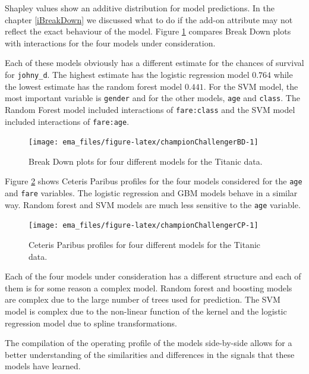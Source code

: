\documentclass[]{krantz}
\begin{document}
Shapley values show an additive distribution for model predictions. In the chapter \ref{iBreakDown} we discussed what to do if the add-on attribute may not reflect the exact behaviour of the model.
Figure \ref{fig:championChallengerBD} compares Break Down plots with interactions for the four models under consideration.

Each of these models obviously has a different estimate for the chances of survival for \texttt{johny\_d}. The highest estimate has the logistic regression model \(0.764\) while the lowest estimate has the random forest model \(0.441\). For the SVM model, the most important variable is \texttt{gender} and for the other models, \texttt{age} and \texttt{class}. The Random Forest model included interactions of \texttt{fare:class} and the SVM model included interactions of \texttt{fare:age}.

\begin{figure}

{\centering \texttt{[image: ema\_files/figure-latex/championChallengerBD-1]} 

}

\caption{Break Down plots for four different models for the Titanic data.}\label{fig:championChallengerBD}
\end{figure}

Figure \ref{fig:championChallengerCP} shows Ceteris Paribus profiles for the four models considered for the \texttt{age} and \texttt{fare} variables.
The logistic regression and GBM models behave in a similar way. Random forest and SVM models are much less sensitive to the \texttt{age} variable.

\begin{figure}

{\centering \texttt{[image: ema\_files/figure-latex/championChallengerCP-1]} 

}

\caption{Ceteris Paribus profiles for four different models for the Titanic data.}\label{fig:championChallengerCP}
\end{figure}

Each of the four models under consideration has a different structure and each of them is for some reason a complex model. Random forest and boosting models are complex due to the large number of trees used for prediction. The SVM model is complex due to the non-linear function of the kernel and the logistic regression model due to spline transformations.

The compilation of the operating profile of the models side-by-side allows for a better understanding of the similarities and differences in the signals that these models have learned.
\end{document}
